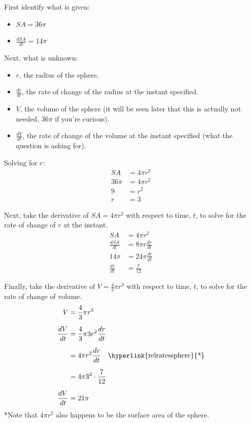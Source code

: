 \documentclass[12pt]{article}
\begin{document}
\begin{enumerate}
	      \noindent First identify what is given:
	      \begin{itemize}
		      \item $SA = 36 \pi$
		      \item $\frac{dSA}{dt} = 14 \pi$
	      \end{itemize}

	      \noindent Next, what is unknown:
	      \begin{itemize}
		      \item $r$, the radius of the sphere.
		      \item $\frac{dr}{dt}$, the rate of change of the radius at the instant specified.
		      \item $V$, the volume of the sphere (it will be seen later that this is actually not needed, $36 \pi$ if you're curious).
		      \item $\frac{dV}{dt}$, the rate of change of the volume at the instant specified (what the question is asking for).
	      \end{itemize}

	      \noindent Solving for $r$:
	      \begin{align*}
		      SA     & = 4 \pi r^2 \\
		      36 \pi & = 4 \pi r^2 \\
		      9      & = r^2       \\
		      r      & = 3
	      \end{align*}

	      \noindent Next, take the derivative of $SA = 4 \pi r^2$ with respect to time, $t$, to solve for the rate of change of $r$ at the instant.
	      \begin{align*}
		      SA             & = 4 \pi r^2             \\
		      \frac{dSA}{dt} & = 8 \pi r \frac{dr}{dt} \\[6pt]
		      14 \pi         & = 24 \pi \frac{dr}{dt}  \\[6pt]
		      \frac{dr}{dt}  & = \frac{7}{12}
	      \end{align*}

	      \noindent Finally, take the derivative of $V = \frac{4}{3} \pi r^3$ with respect to time, $t$, to solve for the rate of change of volume.
	      \begin{align*}
		      V             & = \frac{4}{3} \pi r^3                                                \\[6pt]
		      \frac{dV}{dt} & = \frac{4}{3} \pi 3r^2 \frac{dr}{dt}                                 \\[6pt]
		      & = 4 \pi r^2 \frac{dr}{dt} \quad \text{\hyperlink{relratessphere}{*}} \\[6pt]
		      & = 4 \pi 3^2 \cdot \frac{7}{12}                                       \\[6pt]
		      \frac{dV}{dt} & = 21 \pi
	      \end{align*}
	      \hypertarget{relratessphere}{*}Note that $4 \pi r^2$ also happens to be the surface area of the sphere.
\end{enumerate}
\end{document}
